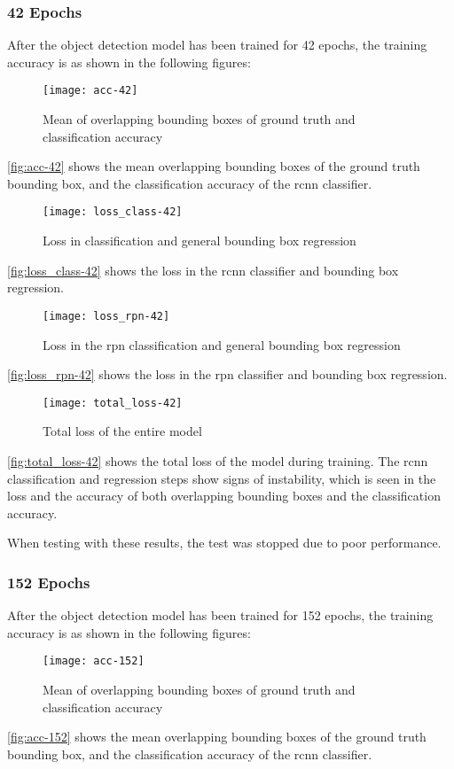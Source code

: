 \subsubsection{42 Epochs}
After the object detection model has been trained for 42 epochs, the training accuracy is as shown in the following figures:
\begin{figure}[H]
	\centering
	\texttt{[image: acc-42]}
	\caption{Mean of overlapping bounding boxes of ground truth and classification accuracy}
	\label{fig:acc-42}
\end{figure}
\autoref{fig:acc-42} shows the mean overlapping bounding boxes of the ground truth bounding box, and the classification accuracy of the \gls{rcnn} classifier.

\begin{figure}[H]
	\centering
	\texttt{[image: loss\_class-42]}
	\caption{Loss in classification and general bounding box regression}
	\label{fig:loss_class-42}
\end{figure}
\autoref{fig:loss_class-42} shows the loss in the \gls{rcnn} classifier and bounding box regression.

\begin{figure}[H]
	\centering
	\texttt{[image: loss\_rpn-42]}
	\caption{Loss in the \gls{rpn} classification and general bounding box regression}
	\label{fig:loss_rpn-42}
\end{figure}
\autoref{fig:loss_rpn-42} shows the loss in the \gls{rpn} classifier and bounding box regression.

\begin{figure}[H]
	\centering
	\texttt{[image: total\_loss-42]}
	\caption{Total loss of the entire model}
	\label{fig:total_loss-42}
\end{figure}
\autoref{fig:total_loss-42} shows the total loss of the model during training. The \gls{rcnn} classification and regression steps show signs of instability, which is seen in the loss and the accuracy of both overlapping bounding boxes and the classification accuracy.

When testing with these results, the test was stopped due to poor performance.

\subsubsection{152 Epochs}
After the object detection model has been trained for 152 epochs, the training accuracy is as shown in the following figures:
\begin{figure}[H]
	\centering
	\texttt{[image: acc-152]}
	\caption{Mean of overlapping bounding boxes of ground truth and classification accuracy}
	\label{fig:acc-152}
\end{figure}
\autoref{fig:acc-152} shows the mean overlapping bounding boxes of the ground truth bounding box, and the classification accuracy of the \gls{rcnn} classifier.

